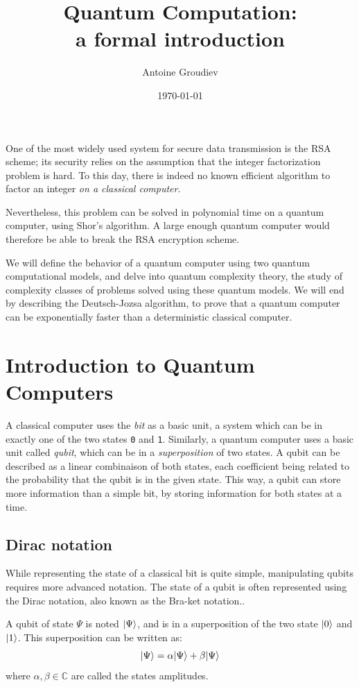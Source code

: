 \documentclass[12pt,a4paper]{article}
\title{\vspace{-5ex} \textbf{Quantum Computation:\\a formal introduction}}
\author{Antoine Groudiev}
\date{\vspace{-1ex}\today}
\theoremstyle{plain}
\theoremstyle{definition}
\DeclarePairedDelimiter\ket{\lvert}{\rangle}
\begin{document}
\maketitle
One of the most widely used system for secure data transmission is the RSA scheme; its security relies on the assumption that the integer factorization problem is hard. To this day, there is indeed no known efficient algorithm to factor an integer \textit{on a classical computer}.

Nevertheless, this problem can be solved in polynomial time on a quantum computer, using Shor's algorithm. A large enough quantum computer would therefore be able to break the RSA encryption scheme.

We will define the behavior of a quantum computer using two quantum computational models, and delve into quantum complexity theory, the study of complexity classes of problems solved using these quantum models. We will end by describing the Deutsch-Jozsa algorithm, to prove that a quantum computer can be exponentially faster than a deterministic classical computer.

\tableofcontents

\section{Introduction to Quantum Computers}
A classical computer uses the \emph{bit} as a basic unit, a system which can be in exactly one of the two states \texttt{0} and \texttt{1}. Similarly, a quantum computer uses a basic unit called \emph{qubit}, which can be in a \emph{superposition} of two states. A qubit can be described as a linear combinaison of both states, each coefficient being related to the probability that the qubit is in the given state. This way, a qubit can store more information than a simple bit, by storing information for both states at a time.

\subsection{Dirac notation}
While representing the state of a classical bit is quite simple, manipulating qubits requires more advanced notation. 
The state of a qubit is often represented using the Dirac notation, also known as the Bra-ket notation.\cite{dirac-notation}.

A qubit of state $\Psi$ is noted $\ket{\Psi}$, and is in a superposition of the two state $\ket{0}$ and $\ket{1}$. This superposition can be written as:
\begin{equation*}
    \ket{\Psi}=\alpha\ket{\Psi}+\beta\ket{\Psi}
\end{equation*}
where $\alpha, \beta\in \mathbb{C}$ are called the states amplitudes. 
\end{document}
